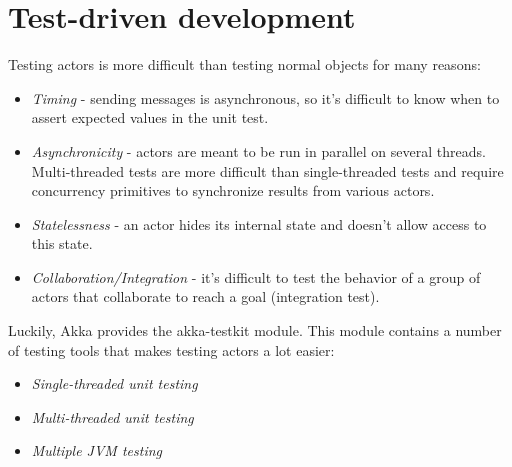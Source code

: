 \documentclass{article}
\begin{document}
\section{Test-driven development}
Testing actors is more difficult than testing normal objects for many reasons:
\begin{itemize}
\item \textit{Timing} - sending messages is asynchronous, so it's difficult to know when to assert expected values in the unit test.
\item \textit{Asynchronicity} - actors are meant to be run in parallel on several threads. Multi-threaded tests are more difficult than single-threaded tests and require concurrency primitives to synchronize results from various actors.
\item \textit{Statelessness} - an actor hides its internal state and doesn't allow access to this state.
\item \textit{Collaboration/Integration} - it's difficult to test the behavior of a group of actors that collaborate to reach a goal (integration test).
\end{itemize}
Luckily, Akka provides the akka-testkit module. This module contains a number of testing tools that makes testing actors a lot easier:
\begin{itemize}
\item \textit{Single-threaded unit testing}
\item \textit{Multi-threaded unit testing}
\item \textit{Multiple JVM testing}
\end{itemize}
\end{document}
